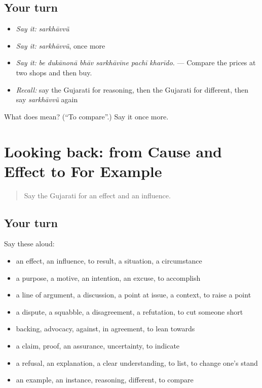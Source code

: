 \subsection*{Your turn}
\begin{itemize}
\raggedright
  \item \emph{Say it:} \emph{sarkhāvvũ}
  \item \emph{Say it:} \emph{sarkhāvvũ}, once more
  \item \emph{Say it:} \emph{be dukānonā bhāv sarkhāvīne pachī kharīdo.} — Compare the prices at two shops and then buy.
  \item \emph{Recall:} say the Gujarati for reasoning, then the Gujarati for different, then say \emph{sarkhāvvũ} again
\end{itemize}

\begin{tcolorbox}[breakable,colback=teal!4,colframe=teal!35!black,title={Before you move on}]
What does  mean? (\textquotedblleft{}To compare\textquotedblright{}.) Say it once more.
\end{tcolorbox}
\section[(dialogue)]{Looking back: from Cause and Effect to For Example}

\label{lesson:GU-R346-review-339-346}



\begin{quote}
Say the Gujarati for an effect and an influence.
\end{quote}

\subsection*{Your turn}
Say these aloud:

\begin{itemize}
\raggedright
  \item an effect, an influence, to result, a situation, a circumstance
  \item a purpose, a motive, an intention, an excuse, to accomplish
  \item a line of argument, a discussion, a point at issue, a context, to raise a point
  \item a dispute, a squabble, a disagreement, a refutation, to cut someone short
  \item backing, advocacy, against, in agreement, to lean towards
  \item a claim, proof, an assurance, uncertainty, to indicate
  \item a refusal, an explanation, a clear understanding, to list, to change one's stand
  \item an example, an instance, reasoning, different, to compare
\end{itemize}

